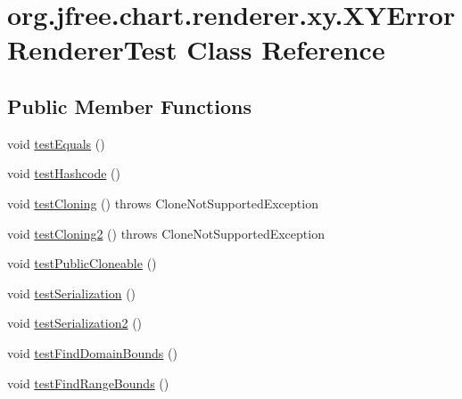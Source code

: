 \hypertarget{classorg_1_1jfree_1_1chart_1_1renderer_1_1xy_1_1_x_y_error_renderer_test}{}\section{org.\+jfree.\+chart.\+renderer.\+xy.\+X\+Y\+Error\+Renderer\+Test Class Reference}
\label{classorg_1_1jfree_1_1chart_1_1renderer_1_1xy_1_1_x_y_error_renderer_test}
\subsection*{Public Member Functions}
\begin{DoxyCompactItemize}
\item 
void \mbox{\hyperlink{classorg_1_1jfree_1_1chart_1_1renderer_1_1xy_1_1_x_y_error_renderer_test_a79537592e3345b284ba5a5bd4ff08599}{test\+Equals}} ()
\item 
void \mbox{\hyperlink{classorg_1_1jfree_1_1chart_1_1renderer_1_1xy_1_1_x_y_error_renderer_test_a3317802cbc6266d90437265b61960e24}{test\+Hashcode}} ()
\item 
void \mbox{\hyperlink{classorg_1_1jfree_1_1chart_1_1renderer_1_1xy_1_1_x_y_error_renderer_test_a8defacd1072d98487852b33193c8de0e}{test\+Cloning}} ()  throws Clone\+Not\+Supported\+Exception 
\item 
void \mbox{\hyperlink{classorg_1_1jfree_1_1chart_1_1renderer_1_1xy_1_1_x_y_error_renderer_test_a57bcf47e17d95c02d8b30509392eb810}{test\+Cloning2}} ()  throws Clone\+Not\+Supported\+Exception 
\item 
void \mbox{\hyperlink{classorg_1_1jfree_1_1chart_1_1renderer_1_1xy_1_1_x_y_error_renderer_test_a77105d6aa7a5ca59a1cb562483c1d9c4}{test\+Public\+Cloneable}} ()
\item 
void \mbox{\hyperlink{classorg_1_1jfree_1_1chart_1_1renderer_1_1xy_1_1_x_y_error_renderer_test_a0c8934495114ad13a361858c9f4b2ac5}{test\+Serialization}} ()
\item 
void \mbox{\hyperlink{classorg_1_1jfree_1_1chart_1_1renderer_1_1xy_1_1_x_y_error_renderer_test_a46619f7f2b78a11f45cd1663deb32e75}{test\+Serialization2}} ()
\item 
void \mbox{\hyperlink{classorg_1_1jfree_1_1chart_1_1renderer_1_1xy_1_1_x_y_error_renderer_test_aada87ccaea1274467105fbdd4bfcf3b4}{test\+Find\+Domain\+Bounds}} ()
\item 
void \mbox{\hyperlink{classorg_1_1jfree_1_1chart_1_1renderer_1_1xy_1_1_x_y_error_renderer_test_a157b5b1721829f04881625f287213d1f}{test\+Find\+Range\+Bounds}} ()
\end{DoxyCompactItemize}


